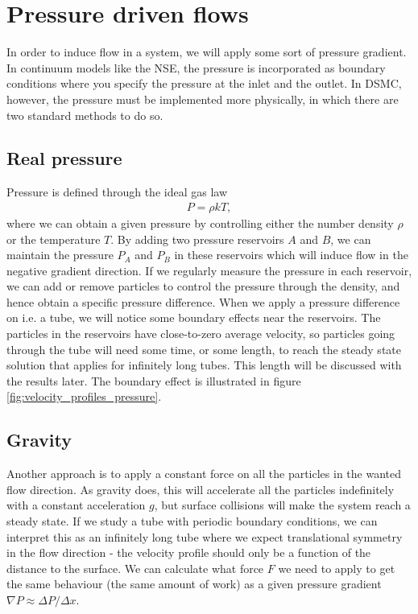 \section{Pressure driven flows}
In order to induce flow in a system, we will apply some sort of pressure gradient. In continuum models like the NSE, the pressure is incorporated as boundary conditions where you specify the pressure at the inlet and the outlet. In DSMC, however, the pressure must be implemented more physically, in which there are two standard methods to do so.
\subsection{Real pressure}
Pressure is defined through the ideal gas law
\begin{align}
	P = \rho k T,
\end{align}
where we can obtain a given pressure by controlling either the number density $\rho$ or the temperature $T$. By adding two pressure reservoirs $A$ and $B$, we can maintain the pressure $P_A$ and $P_B$ in these reservoirs which will induce flow in the negative gradient direction. If we regularly measure the pressure in each reservoir, we can add or remove particles to control the pressure through the density, and hence obtain a specific pressure difference. When we apply a pressure difference on i.e. a tube, we will notice some boundary effects near the reservoirs. The particles in the reservoirs have close-to-zero average velocity, so particles going through the tube will need some time, or some length, to reach the steady state solution that applies for infinitely long tubes. This length will be discussed with the results later. The boundary effect is illustrated in figure \ref{fig:velocity_profiles_pressure}. 

\subsection{Gravity}
Another approach is to apply a constant force on all the particles in the wanted flow direction. As gravity does, this will accelerate all the particles indefinitely with a constant acceleration $g$, but surface collisions will make the system reach a steady state. If we study a tube with periodic boundary conditions, we can interpret this as an infinitely long tube where we expect translational symmetry in the flow direction - the velocity profile should only be a function of the distance to the surface. We can calculate what force $F$ we need to apply to get the same behaviour (the same amount of work) as a given pressure gradient $\nabla P \approx \Delta P / \Delta x$.
